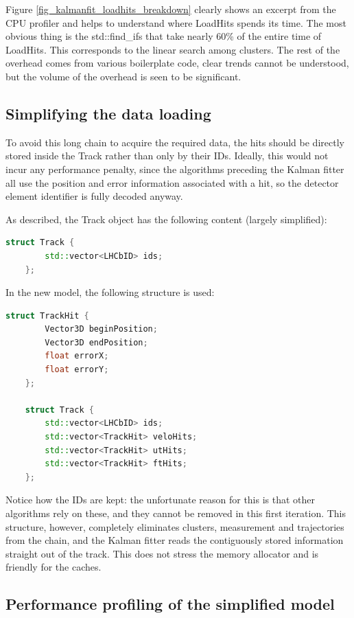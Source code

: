 \documentclass[12pt]{article}
\begin{document}
Figure \ref{fig_kalmanfit_loadhits_breakdown} clearly shows an excerpt from the CPU profiler and helps to understand where LoadHits spends its time. The most obvious thing is the std::find\_ifs that take nearly 60\% of the entire time of LoadHits. This corresponds to the linear search among clusters. The rest of the overhead comes from various boilerplate code, clear trends cannot be understood, but the volume of the overhead is seen to be significant.


\subsection{Simplifying the data loading}

To avoid this long chain to acquire the required data, the hits should be directly stored inside the Track rather than only by their IDs. Ideally, this would not incur any performance penalty, since the algorithms preceding the Kalman fitter all use the position and error information associated with a hit, so the detector element identifier is fully decoded anyway.

As described, the Track object has the following content (largely simplified):
\begin{lstlisting}[language=C++]
	struct Track {
		std::vector<LHCbID> ids;
	};
\end{lstlisting}

In the new model, the following structure is used:
\begin{lstlisting}[language=C++]
	struct TrackHit {
		Vector3D beginPosition;
		Vector3D endPosition;
		float errorX;
		float errorY;
	};
	
	struct Track {
		std::vector<LHCbID> ids;
		std::vector<TrackHit> veloHits;
		std::vector<TrackHit> utHits;
		std::vector<TrackHit> ftHits;
	};
\end{lstlisting}

Notice how the IDs are kept: the unfortunate reason for this is that other algorithms rely on these, and they cannot be removed in this first iteration. This structure, however, completely eliminates clusters, measurement and trajectories from the chain, and the Kalman fitter reads the contiguously stored information straight out of the track. This does not stress the memory allocator and is friendly for the caches.


\subsection{Performance profiling of the simplified model}
\end{document}
